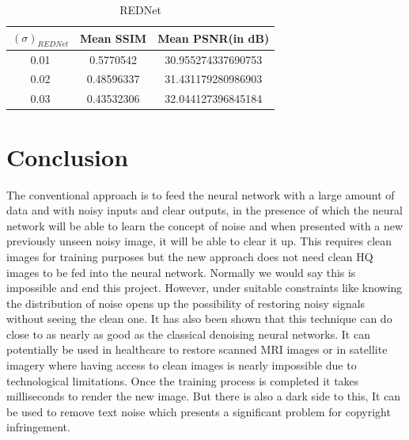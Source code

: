 \documentclass[journal]{IEEEtran} %
\begin{document}
\begin{table}[h!]
\centering
\begin{tabular}{||c c c||} 
 \hline
 $(\sigma)_{REDNet}$ & Mean SSIM & Mean PSNR(in dB)\\ [0.5ex] 
 \hline\hline
 0.01 & 0.5770542 & 30.955274337690753 \\ 
 \hline
 0.02 & 0.48596337 & 31.431179280986903\\
 \hline
 0.03 & 0.43532306 & 32.044127396845184 \\
 \hline
\end{tabular}
\caption{REDNet}
\label{table:2}
\end{table}

\section{Conclusion}

The conventional approach is to feed the neural network with a large amount of data and with noisy inputs and clear outputs, in the presence of which the neural network will be able to learn the concept of noise and when presented with a new previously unseen noisy image, it will be able to clear it up. This requires clean images for training purposes but the new approach does not need clean HQ images to be fed into the neural network. Normally we would say this is impossible and end this project. However, under suitable constraints like knowing the distribution of noise opens up the possibility of restoring noisy signals without seeing the clean one. It has also been shown that this technique can do close to as nearly as good as the classical denoising neural networks. It can potentially be used in healthcare to restore scanned MRI images or in satellite imagery where having access to clean images is nearly impossible due to technological limitations. Once the training process is completed it takes milliseconds to render the new image. But there is also a dark side to this, It can be used to remove text noise which presents a significant problem for copyright infringement. 
\end{document}
